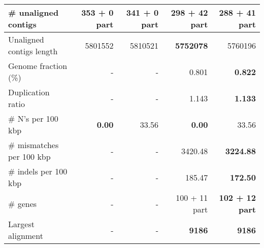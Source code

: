 \documentclass[12pt,a4paper]{article}
\begin{document}
\begin{table}[ht]
\begin{center}
\begin{tabular}{|l*{4}{|r}|}
\# unaligned contigs & 353 + 0 part & 341 + 0 part & 298 + 42 part & {\bf 288 + 41 part} \\ \hline
Unaligned contigs length & 5801552 & 5810521 & {\bf 5752078} & 5760196 \\ \hline
Genome fraction (\%) & - & - & 0.801 & {\bf 0.822} \\ \hline
Duplication ratio & - & - & 1.143 & {\bf 1.133} \\ \hline
\# N's per 100 kbp & {\bf 0.00} & 33.56 & {\bf 0.00} & 33.56 \\ \hline
\# mismatches per 100 kbp & - & - & 3420.48 & {\bf 3224.88} \\ \hline
\# indels per 100 kbp & - & - & 185.47 & {\bf 172.50} \\ \hline
\# genes & - & - & 100 + 11 part & {\bf 102 + 12 part} \\ \hline
Largest alignment & - & - & {\bf 9186} & {\bf 9186} \\ \hline
\end{tabular}
\end{center}
\end{table}
\end{document}
